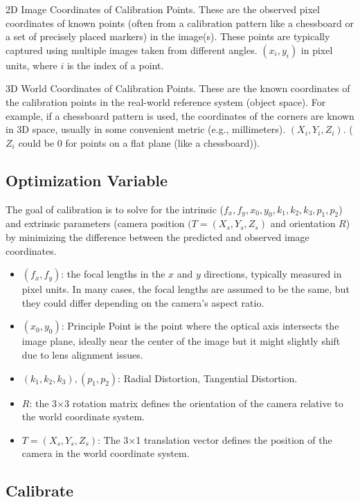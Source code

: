 2D Image Coordinates of Calibration Points. These are the observed pixel coordinates of known points (often from a calibration pattern like a chessboard or a set of precisely placed markers) in the image(s). These points are typically captured using multiple images taken from different angles. $(x_i,y_i)$ in pixel units, where $i$ is the index of a point.

3D World Coordinates of Calibration Points. These are the known coordinates of the calibration points in the real-world reference system (object space). For example, if a chessboard pattern is used, the coordinates of the corners are known in 3D space, usually in some convenient metric (e.g., millimeters). $(X_i, Y_i, Z_i)$. ($Z_i$ could be 0 for points on a flat plane (like a chessboard)).

\subsection{Optimization Variable}

The goal of calibration is to solve for the intrinsic ($f_x, f_y, x_0, y_0, k_1,k_2,k_3, p_1,p_2$) and extrinsic parameters (camera position $(T=(X_s, Y_s, Z_s)$ and orientation $R$) by minimizing the difference between the predicted and observed image coordinates.

\begin{itemize}
    \item $(f_x,f_y)$: the focal lengths in the $x$ and $y$ directions, typically measured in pixel units. In many cases, the focal lengths are assumed to be the same, but they could differ depending on the camera's aspect ratio.
    \item $(x_0,y_0)$: Principle Point is the point where the optical axis intersects the image plane, ideally near the center of the image but it might slightly shift due to lens alignment issues.
    \item $(k_1,k_2,k_3), (p_1,p_2)$: Radial Distortion, Tangential Distortion.
    \item $R$: the 3×3 rotation matrix defines the orientation of the camera relative to the world coordinate system.
    \item $T=(X_s, Y_s, Z_s)$: The 3×1 translation vector defines the position of the camera in the world coordinate system.
\end{itemize}

\subsection{Calibrate}

